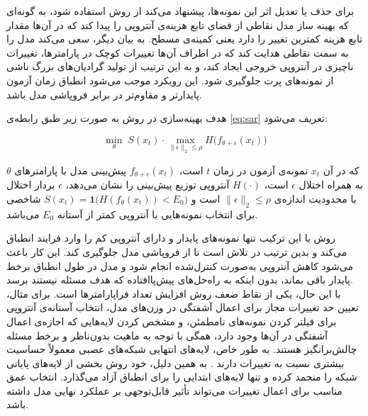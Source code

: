 برای حذف یا تعدیل اثر این نمونه‌ها،  پیشنهاد می‌کند از روش \cite{sam} استفاده شود، به گونه‌ای که بهینه ساز مدل نقاطی از فضای تابع هزینه‌ی آنتروپی را پیدا کند که در آن‌ها مقدار تابع هزینه کمترین تغییر را دارد یعنی {کمینه‌ی مسطح}. به بیان دیگر،  سعی می‌کند مدل را به سمت نقاطی هدایت کند که در اطراف آن‌ها تغییرات کوچک در پارامترها، تغییرات ناچیزی در آنتروپی خروجی ایجاد کند، و به این ترتیب از تولید گرادیان‌های بزرگ ناشی از نمونه‌های پرت جلوگیری شود. این رویکرد موجب می‌شود انطباق زمان آزمون پایدارتر و مقاوم‌تر در برابر فروپاشی مدل باشد.

هدف بهینه‌سازی در روش  به صورت زیر طبق رابطه‌ی \ref{eq:sar} تعریف می‌شود\cite{sar}:

\begin{equation}
	\min_{\theta} \; S(x_t) \cdot \max_{\|\epsilon\|_2 \leq \rho} 
	H\big(f_{\theta + \epsilon}(x_t)\big)
	\label{eq:sar}
\end{equation}

که در آن \(x_t\) نمونه‌ی آزمون در زمان \(t\) است، 
\(f_{\theta + \epsilon}(x_t)\) پیش‌بینی مدل با پارامترهای \(\theta\) به همراه اختلال \(\epsilon\) است، 
\(H(\cdot)\) آنتروپی توزیع پیش‌بینی را نشان می‌دهد، 
\(\epsilon\) بردار اختلال با محدودیت اندازه‌ی \(\|\epsilon\|_2 \leq \rho\) است و 
\(S(x_t) = \mathbf{1}\big(H(f_\theta(x_t)) < E_0\big)\) شاخصی برای انتخاب نمونه‌هایی با آنتروپی کمتر از آستانه \(E_0\) می‌باشد.

روش  با این ترکیب تنها نمونه‌های پایدار و دارای آنتروپی کم را وارد فرایند انطباق می‌کند و بدین ترتیب در تلاش است تا از فروپاشی مدل جلوگیری کند. این کار باعث می‌شود کاهش آنتروپی به‌صورت کنترل‌شده انجام شود و مدل در طول انطباق برخط پایدار باقی بماند، بدون اینکه به راه‌حل‌های پیش‌پاافتاده که هدف مسئله نیستند برسد.\\
با این حال، یکی از نقاط ضعف روش  افزایش تعداد فراپارامترها است. برای مثال، تعیین حد تغییرات مجاز برای اعمال آشفتگی در وزن‌های مدل، انتخاب آستانه‌ی آنتروپی برای فیلتر کردن نمونه‌های نامطمئن، و مشخص کردن لایه‌هایی که اجازه‌ی اعمال آشفتگی در آن‌ها وجود دارد، همگی با توجه به ماهیت بدون‌ناظر و برخط مسئله چالش‌برانگیز هستند. به طور خاص، لایه‌های انتهایی شبکه‌های عصبی معمولاً حساسیت بیشتری نسبت به تغییرات دارند \cite{mummadi2021confidence,choi2022improving}. به همین دلیل، خود روش  بخشی از لایه‌های پایانی شبکه را {منجمد} کرده و تنها لایه‌های ابتدایی را برای انطباق آزاد می‌گذارد. انتخاب عمق مناسب برای اعمال تغییرات می‌تواند تأثیر قابل‌توجهی بر عملکرد نهایی مدل داشته باشد.


